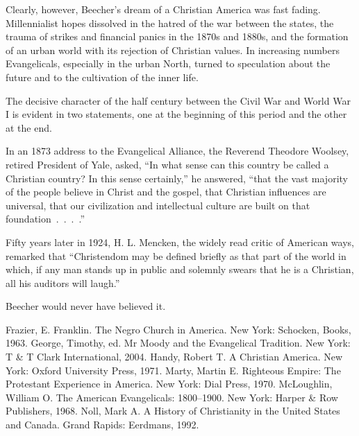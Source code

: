 Clearly, however, Beecher’s dream of a Christian America was fast fading. Millennialist hopes
dissolved in the hatred of the war between the states, the trauma of strikes and financial panics in
the 1870s and 1880s, and the formation of an urban world with its rejection of Christian values. In
increasing numbers Evangelicals, especially in the urban North, turned to speculation about the
future and to the cultivation of the inner life.

The decisive character of the half century between the Civil War and World War I is evident in two
statements, one at the beginning of this period and the other at the end.

In an 1873 address to the Evangelical Alliance, the Reverend Theodore Woolsey, retired President of
Yale, asked, “In what sense can this country be called a Christian country? In this sense
certainly,” he answered, “that the vast majority of the people believe in Christ and the gospel,
that Christian influences are universal, that our civilization and intellectual culture are built on
that foundation~.~.~.~.”

Fifty years later in 1924, H. L. Mencken, the widely read critic of American ways, remarked that
“Christendom may be defined briefly as that part of the world in which, if any man stands up in
public and solemnly swears that he is a Christian, all his auditors will laugh.”

Beecher would never have believed it.

\begin{readinglist}
\entry Frazier, E. Franklin. The Negro Church in America. New York: Schocken, Books, 1963.
\entry George, Timothy, ed. Mr Moody and the Evangelical Tradition. New York: T \& T Clark
  International, 2004.
\entry Handy, Robert T. A Christian America. New York: Oxford University Press, 1971.
\entry Marty, Martin E. Righteous Empire: The Protestant Experience in America. New York: Dial
  Press, 1970.
\entry McLoughlin, William O. The American Evangelicals: 1800–1900. New York: Harper \& Row
  Publishers, 1968.
\entry Noll, Mark A. A History of Christianity in the United States and Canada. Grand Rapids:
  Eerdmans, 1992.
\end{readinglist}
